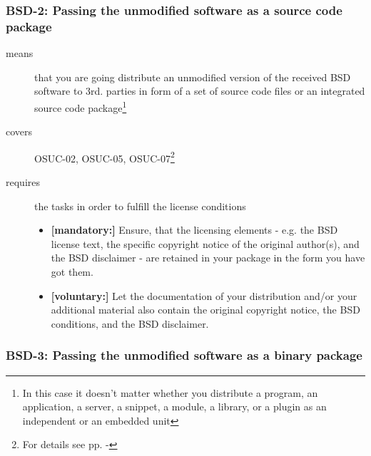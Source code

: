 \subsubsection{BSD-2: Passing the unmodified software as a source code package}
\label{OSUC-02-BSD} \label{OSUC-05-BSD} \label{OSUC-07-BSD} 

\begin{description}
\item[means] that you are going distribute an unmodified version of the received
BSD software to 3rd. parties in form of a set of source code files or an
integrated source code package\footnote{In this case it doesn't matter whether
you  distribute a program, an application, a server, a snippet, a module, a
library, or a plugin as an independent or an embedded unit} 

\item[covers] OSUC-02, OSUC-05, OSUC-07\footnote{For details see pp.
\pageref{OSUC-02-DEF} - \pageref{OSUC-07-DEF}}

\item[requires] the tasks in order to fulfill the license conditions
\begin{itemize}
  \item \textbf{[mandatory:]} Ensure, that the licensing elements - e.g.
  the BSD license text, the specific copyright notice of the original author(s),
  and the BSD disclaimer - are retained in your package in the form you have got
  them.
  \item \textbf{[voluntary:]} Let the documentation of your distribution
  and/or your additional material also contain the original copyright notice, the
  BSD conditions, and the BSD disclaimer.
\end{itemize}
\end{description}

\subsubsection{BSD-3: Passing the unmodified software as a binary package}

